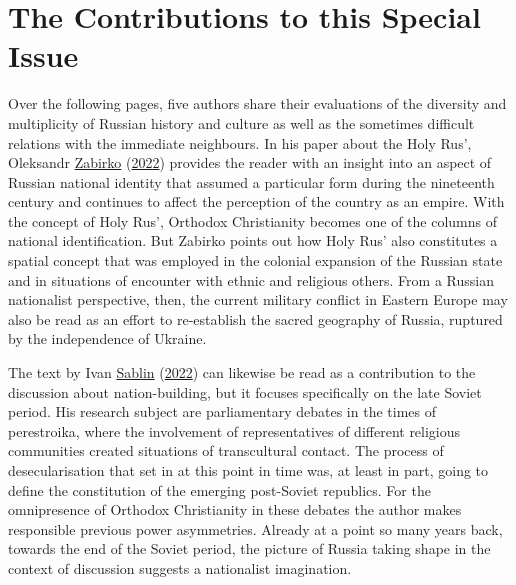 \documentclass[
  english,
  a4paper,
  DIV=12,
  footlines=2.1,
  usegeometry=true]{scrartcl}
\begin{document}
\hypertarget{the-contributions-to-this-special-issue}{%
\section{The Contributions to this Special
Issue}\label{the-contributions-to-this-special-issue}}

\leavevmode\marginpar{\textcolor{parnum}{{[}14{]}}}Over the following
pages, five authors share their evaluations of the diversity and
multiplicity of Russian history and culture as well as the sometimes
difficult relations with the immediate neighbours. In his paper about
the Holy Rus', Oleksandr
\protect\hyperlink{ref-zabirko_concept_2022}{Zabirko}
(\protect\hyperlink{ref-zabirko_concept_2022}{2022}) provides the reader
with an insight into an aspect of Russian national identity that assumed
a particular form during the nineteenth century and continues to affect
the perception of the country as an empire. With the concept of Holy
Rus', Orthodox Christianity becomes one of the columns of national
identification. But Zabirko points out how Holy Rus' also constitutes a
spatial concept that was employed in the colonial expansion of the
Russian state and in situations of encounter with ethnic and religious
others. From a Russian nationalist perspective, then, the current
military conflict in Eastern Europe may also be read as an effort to
re-establish the sacred geography of Russia, ruptured by the
independence of Ukraine.

\leavevmode\marginpar{\textcolor{parnum}{{[}15{]}}}The text by Ivan
\protect\hyperlink{ref-sablin_spiritual_2022}{Sablin}
(\protect\hyperlink{ref-sablin_spiritual_2022}{2022}) can likewise be
read as a contribution to the discussion about nation-building, but it
focuses specifically on the late Soviet period. His research subject are
parliamentary debates in the times of perestroika, where the involvement
of representatives of different religious communities created situations
of transcultural contact. The process of desecularisation that set in at
this point in time was, at least in part, going to define the
constitution of the emerging post-Soviet republics. For the omnipresence
of Orthodox Christianity in these debates the author makes responsible
previous power asymmetries. Already at a point so many years back,
towards the end of the Soviet period, the picture of Russia taking shape
in the context of discussion suggests a nationalist imagination.
\end{document}
